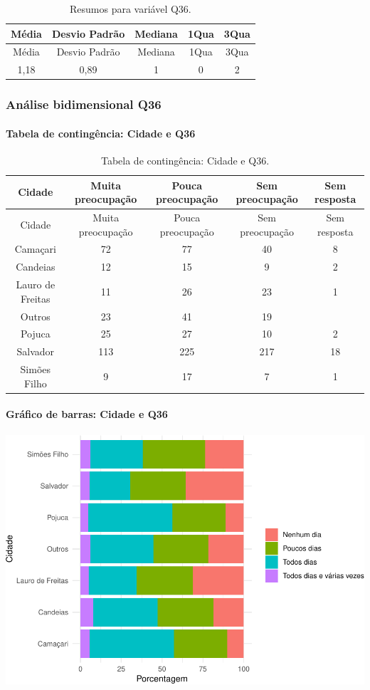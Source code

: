 \documentclass[]{article}
\let\oldparagraph\paragraph
\renewcommand{\paragraph}[1]{\oldparagraph{#1}\mbox{}}
\begin{document}
\begin{longtable}[]{@{}ccccc@{}}
\caption{\label{tab:unnamed-chunk-1309}Resumos para variável Q36.}\tabularnewline
\toprule
Média & Desvio Padrão & Mediana & 1Qua & 3Qua\tabularnewline
\midrule
\endfirsthead
\toprule
Média & Desvio Padrão & Mediana & 1Qua & 3Qua\tabularnewline
\midrule
\endhead
1,18 & 0,89 & 1 & 0 & 2\tabularnewline
\bottomrule
\end{longtable}

\cleardoublepage

\hypertarget{anuxe1lise-bidimensional-q36}{%
\subsubsection{Análise bidimensional Q36}\label{anuxe1lise-bidimensional-q36}}

\hypertarget{tabela-de-continguxeancia-cidade-e-q36}{%
\paragraph{Tabela de contingência: Cidade e Q36}\label{tabela-de-continguxeancia-cidade-e-q36}}

\begin{longtable}[]{@{}ccccc@{}}
\caption{\label{tab:unnamed-chunk-1310}Tabela de contingência: Cidade e Q36.}\tabularnewline
\toprule
Cidade & Muita preocupação & Pouca preocupação & Sem preocupação & Sem resposta\tabularnewline
\midrule
\endfirsthead
\toprule
Cidade & Muita preocupação & Pouca preocupação & Sem preocupação & Sem resposta\tabularnewline
\midrule
\endhead
Camaçari & 72 & 77 & 40 & 8\tabularnewline
Candeias & 12 & 15 & 9 & 2\tabularnewline
Lauro de Freitas & 11 & 26 & 23 & 1\tabularnewline
Outros & 23 & 41 & 19 &\tabularnewline
Pojuca & 25 & 27 & 10 & 2\tabularnewline
Salvador & 113 & 225 & 217 & 18\tabularnewline
Simões Filho & 9 & 17 & 7 & 1\tabularnewline
\bottomrule
\end{longtable}

\hypertarget{gruxe1fico-de-barras-cidade-e-q36}{%
\paragraph{Gráfico de barras: Cidade e Q36}\label{gruxe1fico-de-barras-cidade-e-q36}}

\begin{center}\includegraphics[width=0.75\linewidth]{relatorio_covid19_files/figure-latex/unnamed-chunk-1311-1} \end{center}
\end{document}
